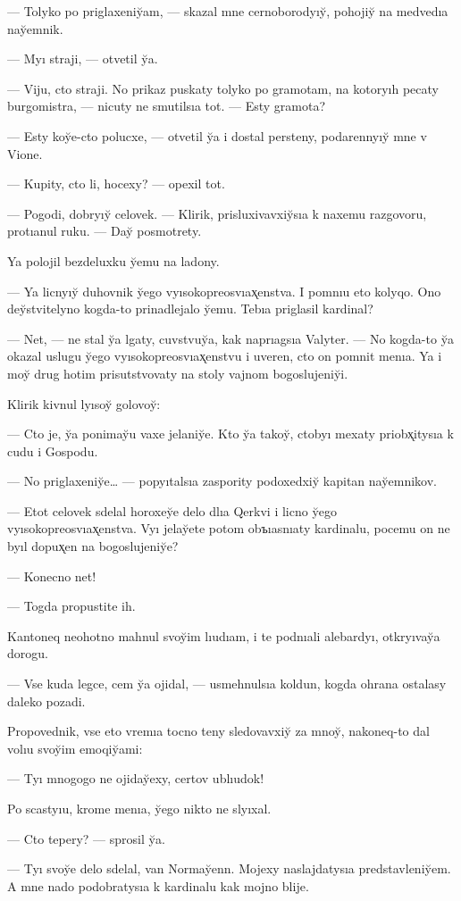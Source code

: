 \documentclass[10pt]{book}
\begin{document}
— Tolyko po priglaxeniy̆am, — skazal mne cernoborodyıy̆, pohojiy̆ na medvedıa nay̆emnik.

— Myı straji, — otvetil y̆a.

— Viju, cto straji. No prikaz puskaty tolyko po gramotam, na kotoryıh pecaty burgomistra, — nicuty ne smutilsıa tot. — Esty gramota?

— Esty koy̆e-cto polucxe, — otvetil y̆a i dostal persteny, podarennyıy̆ mne v Vione.

— Kupity, cto li, hocexy? — opexil tot.

— Pogodi, dobryıy̆ celovek. — Klirik, prisluxivavxiy̆sıa k naxemu razgovoru, protıanul ruku. — Day̆ posmotrety.

Ya polojil bezdeluxku y̆emu na ladony.

— Ya licnyıy̆ duhovnik y̆ego vyısokopreosvıax̨enstva. I pomnıu eto kolyqo. Ono dey̆stvitelyno kogda-to prinadlejalo y̆emu. Tebıa priglasil kardinal?

— Net, — ne stal y̆a lgaty, cuvstvuy̆a, kak naprıagsıa Valyter. — No kogda-to y̆a okazal uslugu y̆ego vyısokopreosvıax̨enstvu i uveren, cto on pomnit menıa. Ya i moy̆ drug hotim prisutstvovaty na stoly vajnom bogoslujeniy̆i.

Klirik kivnul lyısoy̆ golovoy̆:

— Cto je, y̆a ponimay̆u vaxe jelaniy̆e. Kto y̆a takoy̆, ctobyı mexaty priobx̨itysıa k cudu i Gospodu.

— No priglaxeniy̆e… — popyıtalsıa zaspority podoxedxiy̆ kapitan nay̆emnikov.

— Etot celovek sdelal horoxey̆e delo dlıa Qerkvi i licno y̆ego vyısokopreosvıax̨enstva. Vyı jelay̆ete potom obъıasnıaty kardinalu, pocemu on ne byıl dopux̨en na bogoslujeniy̆e?

— Konecno net!

— Togda propustite ih.

Kantoneq neohotno mahnul svoy̆im lıudıam, i te podnıali alebardyı, otkryıvay̆a dorogu.

— Vse kuda legce, cem y̆a ojidal, — usmehnulsıa koldun, kogda ohrana ostalasy daleko pozadi.

Propovednik, vse eto vremıa tocno teny sledovavxiy̆ za mnoy̆, nakoneq-to dal volıu svoy̆im emoqiy̆ami:

— Tyı mnogogo ne ojiday̆exy, certov ublıudok!

Po scastyıu, krome menıa, y̆ego nikto ne slyıxal.

— Cto tepery? — sprosil y̆a.

— Tyı svoy̆e delo sdelal, van Normay̆enn. Mojexy naslajdatysıa predstavleniy̆em. A mne nado podobratysıa k kardinalu kak mojno blije.
\end{document}
